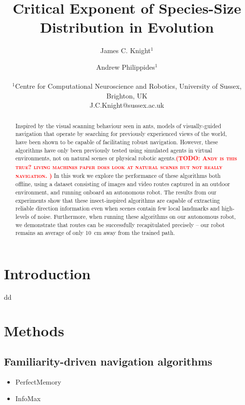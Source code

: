 \documentclass[letterpaper]{article}
\title{Critical Exponent of Species-Size Distribution in Evolution}
\author{James C. Knight$^{1}$ \and Andrew Philippides$^{1}$ \\
\mbox{}\\
$^1$Centre for Computational Neuroscience and Robotics, University of Sussex, Brighton, UK \\
J.C.Knight@sussex.ac.uk} %
\newcommand{\todo}[1]{\textbf{\textsc{\textcolor{red}{(TODO: #1)}}}}
\begin{document}
\maketitle

\begin{abstract}
Inspired by the visual scanning behaviour seen in ants, models of visually-guided navigation that operate by searching for previously experienced views of the world, have been shown to be capable of facilitating robust navigation.
However, these algorithms have only been previously tested using simulated agents in virtual environments, not on natural scenes or physical robotic agents.\todo{Andy is this true? living machines paper does look at natural scenes but not really navigation. }
In this work we explore the performance of these algorithms both offline, using a dataset consisting of images and video routes captured in an outdoor environment, and running onboard an autonomous robot.
The results from our experiments show that these insect-inspired algorithms are capable of extracting reliable direction information even when scenes contain few local landmarks and high-levels of noise.
Furthermore, when running these algorithms on our autonomous robot, we demonstrate that routes can be successfully recapitulated precisely -- our robot remains an average of only \SI{10}{\centi\metre} away from the trained path.
\end{abstract}

\section{Introduction}
dd

\section{Methods}
\subsection{Familiarity-driven navigation algorithms}
\label{sec:navigation_algorithms}
\begin{itemize}
    \item PerfectMemory
    \item InfoMax
\end{itemize}
\end{document}
